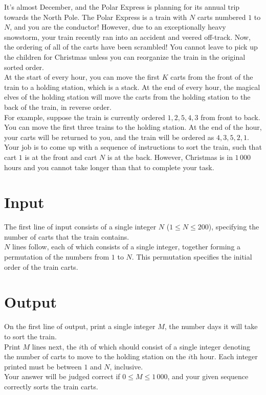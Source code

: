 
\noindent It's almost December, and the Polar Express is planning for its annual trip towards the North Pole. The Polar Express is a train with $N$ carts numbered $1$ to $N$, and you are the conductor! However, due to an exceptionally heavy snowstorm, your train recently ran into an accident and veered off-track. Now, the ordering of all of the carts have been scrambled! You cannot leave to pick up the children for Christmas unless you can reorganize the train in the original sorted order.\\

At the start of every hour, you can move the first $K$ carts from the front of the train to a holding station, which is a stack. At the end of every hour, the magical elves of the holding station will move the carts from the holding station to the back of the train, in reverse order.\\

For example, suppose the train is currently ordered $1, 2, 5, 4, 3$ from front to back. You can move the first three trains to the holding station. At the end of the hour, your carts will be returned to you, and the train will be ordered as $4, 3, 5, 2, 1$.\\

Your job is to come up with a sequence of instructions to sort the train, such that cart $1$ is at the front and cart $N$ is at the back. However, Christmas is in $1\,000$ hours and you cannot take longer than that to complete your task.

\section*{Input}
The first line of input consists of a single integer $N$ ($1 \leq N \leq 200$), specifying the number of carts that the train contains.\\
$N$ lines follow, each of which consists of a single integer, together forming a permutation of the numbers from $1$ to $N$. This permutation specifies the initial order of the train carts.

\section*{Output}
On the first line of output, print a single integer $M$, the number days it will take to sort the train.\\
Print $M$ lines next, the $i$th of which should consist of a single integer denoting the number of carts to move to the holding station on the $i$th hour. Each integer printed must be between $1$ and $N$, inclusive.\\
Your answer will be judged correct if $0 \leq M \leq 1\,000$, and your given sequence correctly sorts the train carts.\\
